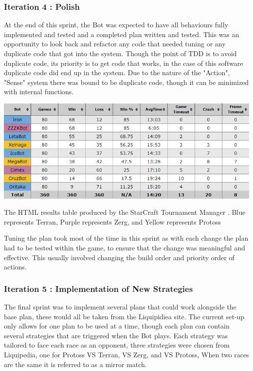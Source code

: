 \documentclass[journal]{IEEEtran}
\begin{document}
	\subsubsection{Iteration 4 : Polish}
	At the end of this sprint, the Bot was expected to have all behaviours fully implemented and tested and a completed plan written and tested. This was an opportunity to look back and refactor any code that needed tuning or any duplicate code that got into the system. Though the point of TDD is to avoid duplicate code, its priority is to get code that works, in the case of this software duplicate code did end up in the system. Due to the nature of the "Action", "Sense" system there was bound to be duplicate code, though it can be minimized with internal functions.
	\begin{table}[]
		\centering
		\includegraphics[width=\textwidth]{STMResults}
		\caption{The HTML results table produced by the StarCraft Tournament Manager \cite{Tournament}. Blue represents Terran, Purple represents Zerg, and Yellow represents Protoss}
		\label{Table1}
	\end{table}
	Tuning the plan took most of the time in this sprint as with each change the plan had to be tested within the game, to ensure that the change was meaningful and effective. This usually involved changing the build order and priority order of actions.
	\newline
	
	\subsubsection{Iteration 5 : Implementation of New Strategies}
	The final sprint was to implement several plans that could work alongside the base plan, these would all be taken from the Liquipidiea site. The current set-up only allows for one plan to be used at a time, though each plan can contain several strategies that are triggered when the Bot plays. Each strategy was tailored to face each race as an opponent, three strategies were chosen from Liquipedia, one for Protoss VS Terran, VS Zerg, and VS Protoss, When two races are the same it is referred to as a mirror match.
	
\end{document}
